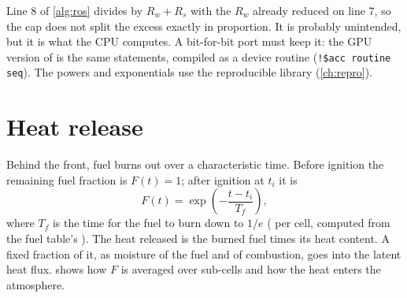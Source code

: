 \begin{portnote}
Line 8 of \cref{alg:ros} divides by $R_w + R_s$ with the $R_w$ already reduced on line 7, so the cap does not split
the excess exactly in proportion. It is probably unintended, but it is what the CPU computes. A bit-for-bit port must
keep it: the GPU version of  is the same statements, compiled as a device routine
(\texttt{!\$acc routine seq}). The powers and exponentials use the reproducible library (\cref{ch:repro}).
\end{portnote}

\section{Heat release}

Behind the front, fuel burns out over a characteristic time. Before ignition the remaining fuel fraction is
$F(t) = 1$; after ignition at $t_i$ it is
\begin{equation}
  F(t) = \exp\!\left(-\frac{t - t_i}{T_f}\right),
\end{equation}
where $T_f$ is the time for the fuel to burn down to $1/e$ ( per cell, computed from the fuel table's ). The heat
released is the burned fuel times its heat content. A fixed fraction of it, as moisture of the fuel and of
combustion, goes into the latent heat flux.  shows how $F$ is averaged over sub-cells and how the heat
enters the atmosphere.
